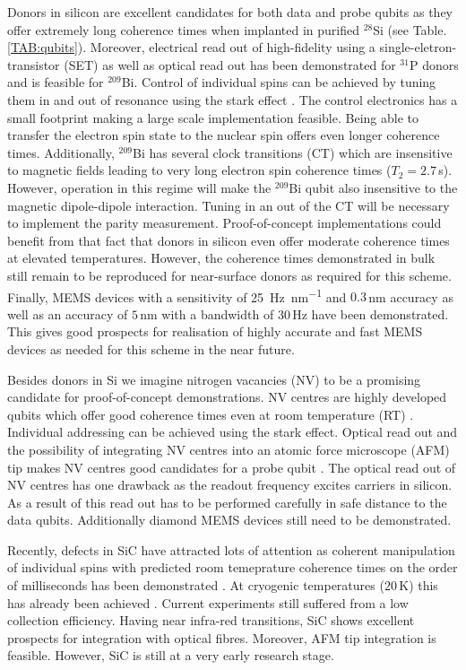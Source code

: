 Donors in silicon are excellent candidates for both data and probe qubits as they offer extremely long coherence times when implanted in purified $^{28}$Si (see Table. \ref{TAB:qubits}). Moreover, electrical read out of high-fidelity using a single-eletron-transistor (SET) \cite{Pla2012,Pla2013,Muhonen2014} as well as optical \cite{Lo2015} read out has been demonstrated for $^{31}$P donors and is feasible for $^{209}$Bi. Control of individual spins can be achieved by tuning them in and out of resonance using the stark effect \cite{Pica2014}. The control electronics has a small footprint making a large scale implementation feasible. Being able to transfer the electron spin state to the nuclear spin offers even longer coherence times. Additionally, $^{209}$Bi has several clock transitions (CT) which are insensitive to magnetic fields leading to very long electron spin coherence times ($T_2=2.7\, $s). However, operation in this regime will make the $^{209}$Bi qubit also insensitive to the magnetic dipole-dipole interaction. Tuning in an out of the CT will be necessary to implement the parity measurement. Proof-of-concept implementations could benefit from that fact that donors in silicon even offer moderate coherence times at elevated temperatures. However, the coherence times demonstrated in bulk still remain to be reproduced for near-surface donors as required for this scheme.
Finally, MEMS devices with a sensitivity of \SI{25}{\hertz\per nm} and $0.3\, $nm accuracy \cite{Chu2003} as well as an accuracy of $5\, $nm with a bandwidth of $30\, $Hz have been demonstrated. This gives good prospects for realisation of highly accurate and fast MEMS devices as needed for this scheme in the near future. 

Besides donors in Si we imagine nitrogen vacancies (NV) to be a promising candidate for proof-of-concept demonstrations. NV centres are highly developed qubits \cite{Bar-Gill2013} which offer good coherence times even at room temperature (RT) \cite{Balasubramanian2009}. Individual addressing can be achieved using the stark effect. Optical read out and the possibility of integrating NV centres into an atomic force microscope (AFM) tip makes NV centres good candidates for a probe qubit \cite{Grinolds2013}. The optical read out of NV centres has one drawback as the readout frequency excites carriers in silicon. As a result of this read out has to be performed carefully in safe distance to the data qubits. Additionally diamond MEMS devices still need to be demonstrated.

Recently, defects in SiC have attracted lots of attention \cite{Morello2015} as coherent manipulation of individual spins with predicted room temeprature coherence times on the order of milliseconds has been demonstrated \cite{Widmann2014}. At cryogenic temperatures ($20\, $K) this has already been achieved \cite{Christle2014}. Current experiments still suffered from a low collection efficiency. Having near infra-red transitions, SiC shows excellent prospects for integration with optical fibres. Moreover, AFM tip integration is feasible. However, SiC is still at a very early research stage.  



